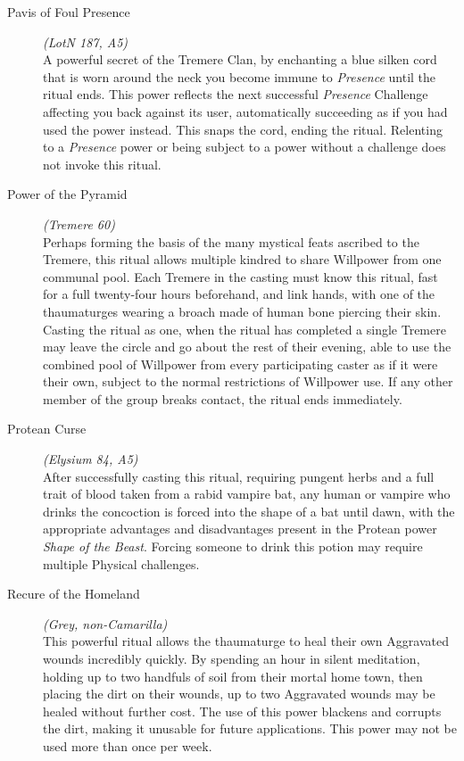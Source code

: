 \begin{description}
	\item[Pavis of Foul Presence] \emph{(LotN 187, A5)} \hfill \\
	A powerful secret of the Tremere Clan, by enchanting a blue silken cord that is worn around the neck you become immune to 
	\emph{Presence} until the ritual ends.  This power reflects the next successful \emph{Presence} Challenge affecting you back 
	against its user, automatically succeeding as if you had used the power instead.  This snaps the cord, ending the ritual.  
	Relenting to a \emph{Presence} power or being subject to a power without a challenge does not invoke this ritual. \\

	\item[Power of the Pyramid] \emph{(Tremere 60)} \hfill \\
	Perhaps forming the basis of the many mystical feats ascribed to the Tremere, this ritual allows multiple kindred to share 
	Willpower from one communal pool.  Each Tremere in the casting must know this ritual, fast for a full twenty-four hours 
	beforehand, and link hands, with one of the thaumaturges wearing a broach made of human bone piercing their skin.  Casting 
	the ritual as one, when the ritual has completed a single Tremere may leave the circle and go about the rest of their 
	evening, able to use the combined pool of Willpower from every participating caster as if it were their own, subject to the 
	normal restrictions of Willpower use.  If any other member of the group breaks contact, the ritual ends immediately. \\

	\item[Protean Curse] \emph{(Elysium 84, A5)} \hfill \\
	After successfully casting this ritual, requiring pungent herbs and a full trait of blood taken from a rabid vampire bat, any 
	human or vampire who drinks the concoction is forced into the shape of a bat until dawn, with the appropriate advantages and 
	disadvantages present in the Protean power \emph{Shape of the Beast}.  Forcing someone to drink this potion may require 
	multiple Physical challenges. \\

	\item[Recure of the Homeland] \emph{(Grey, non-Camarilla)} \hfill \\
	This powerful ritual allows the thaumaturge to heal their own Aggravated wounds incredibly quickly.  By spending an hour in silent 
	meditation, holding up to two handfuls of soil from their mortal home town, then placing the dirt on their wounds, up to two 
	Aggravated wounds may be healed without further cost.  The use of this power blackens and corrupts the dirt, making it unusable 
	for future applications.  This power may not be used more than once per week. \\


\end{description}
